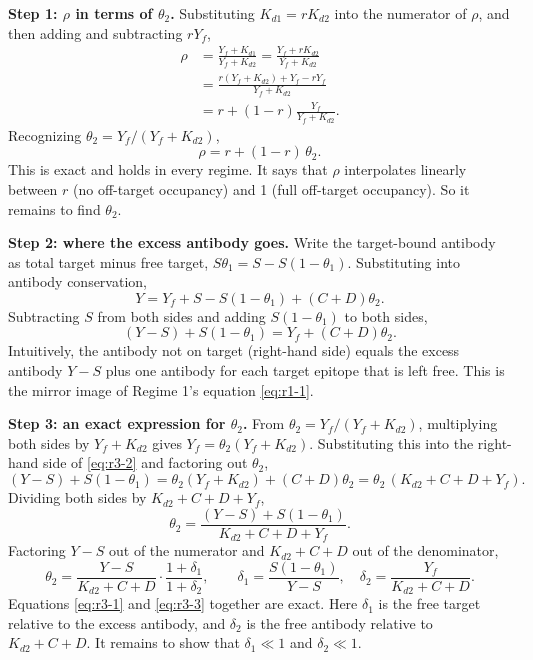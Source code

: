 \textbf{Step 1: $\rho$ in terms of $\theta_2$.} Substituting
$K_{d1}=rK_{d2}$ into the numerator of $\rho$, and then adding and
subtracting $rY_f$,
$$\begin{aligned}
\rho
&=\frac{Y_f+K_{d1}}{Y_f+K_{d2}}
=\frac{Y_f+rK_{d2}}{Y_f+K_{d2}} \\
&=\frac{r(Y_f+K_{d2})+Y_f-rY_f}{Y_f+K_{d2}} \\
&=r+(1-r)\frac{Y_f}{Y_f+K_{d2}}.
\end{aligned}$$
Recognizing $\theta_2=Y_f/(Y_f+K_{d2})$,
\begin{equation}
\rho=r+(1-r)\,\theta_2.
\label{eq:r3-1}
\end{equation}
This is exact and holds in every regime. It says that $\rho$ interpolates
linearly between $r$ (no off-target occupancy) and 1 (full off-target
occupancy). So it remains to find $\theta_2$.

\textbf{Step 2: where the excess antibody goes.} Write the
target-bound antibody as total target minus free target,
$S\theta_1=S-S(1-\theta_1)$. Substituting into antibody conservation,
$$
Y=Y_f+S-S(1-\theta_1)+(C+D)\theta_2.
$$
Subtracting $S$ from both sides and adding $S(1-\theta_1)$ to both sides,
\begin{equation}
(Y-S)+S(1-\theta_1)=Y_f+(C+D)\theta_2.
\label{eq:r3-2}
\end{equation}
Intuitively, the antibody not on target (right-hand side) equals the
excess antibody $Y-S$ plus one antibody for each target epitope that is
left free. This is the mirror image of Regime 1's equation
\eqref{eq:r1-1}.

\textbf{Step 3: an exact expression for $\theta_2$.} From
$\theta_2=Y_f/(Y_f+K_{d2})$, multiplying both sides by $Y_f+K_{d2}$ gives
$Y_f=\theta_2(Y_f+K_{d2})$. Substituting this into the right-hand side of
\eqref{eq:r3-2} and factoring out $\theta_2$,
$$
(Y-S)+S(1-\theta_1)
=\theta_2(Y_f+K_{d2})+(C+D)\theta_2
=\theta_2\,(K_{d2}+C+D+Y_f).
$$
Dividing both sides by $K_{d2}+C+D+Y_f$,
$$
\theta_2=\frac{(Y-S)+S(1-\theta_1)}{K_{d2}+C+D+Y_f}.
$$
Factoring $Y-S$ out of the numerator and $K_{d2}+C+D$ out of the
denominator,
\begin{equation}
\theta_2
=\frac{Y-S}{K_{d2}+C+D}\cdot\frac{1+\delta_1}{1+\delta_2},
\qquad
\delta_1=\frac{S(1-\theta_1)}{Y-S},
\quad
\delta_2=\frac{Y_f}{K_{d2}+C+D}.
\label{eq:r3-3}
\end{equation}
Equations \eqref{eq:r3-1} and \eqref{eq:r3-3} together are exact. Here
$\delta_1$ is the free target relative to the excess antibody, and
$\delta_2$ is the free antibody relative to $K_{d2}+C+D$. It remains to
show that $\delta_1\ll1$ and $\delta_2\ll1$.

